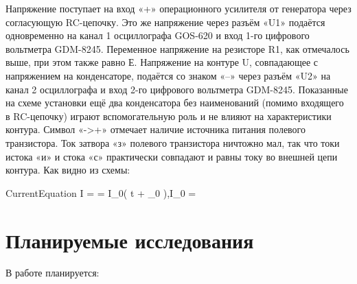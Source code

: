 Напряжение  поступает на вход «+» операционного усилителя от генератора через согласующую RC-цепочку. Это же напряжение через разъём «U1» подаётся одновременно на канал 1 осциллографа GOS-620 и вход 1-го цифрового вольтметра GDM-8245. Переменное напряжение на резисторе R1, как отмечалось выше, при этом также равно Е. Напряжение на контуре U, совпадающее с напряжением на конденсаторе, подаётся со знаком «–» через разъём «U2» на канал 2 осциллографа и вход 2-го цифрового вольтметра GDM-8245. Показанные на схеме установки ещё два конденсатора без наименований (помимо входящего в RC-цепочку) играют вспомогательную роль и не влияют на характеристики контура. Символ «->+» отмечает наличие источника питания полевого транзистора. Ток затвора «з» полевого транзистора ничтожно мал, так что токи истока «и» и стока «с» практически совпадают и равны току во внешней цепи контура. Как видно из схемы:

\formula
{}
{CurrentEquation}
{I =  = I_0\cos\left( \omega t + \phi_0 \right),\qquad I_0 = }

\section{Планируемые исследования}

В работе планируется:

